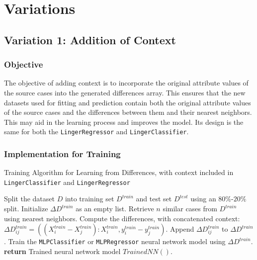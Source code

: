 \documentclass[a4paper, 12pt]{report}
\begin{document}
\section{Variations}
\subsection{Variation 1: Addition of Context}

\subsubsection{Objective}
The objective of adding context is to incorporate the original attribute values of the source cases into the generated differences array. 
This ensures that the new datasets used for fitting and prediction contain both the original attribute values of the source cases and the differences between them and their nearest neighbors. 
This may aid in the learning process and improves the model. Its design is the same for both the \texttt{LingerRegressor} and \texttt{LingerClassifier}.

\subsubsection{Implementation for Training}
\begin{algorithm}[H]
    \caption{Training Algorithm for Learning from Differences, with context included in \texttt{LingerClassifier} and \texttt{LingerRegressor}}
    \label{alg:learning_from_differences_variant_1_train}
    \begin{algorithmic}[1]
        \State Split the dataset $D$ into training set $D^{train}$ and test set $D^{test}$ using an $80\%$-$20\%$ split.
        \State Initialize $\Delta D^{train}$ as an empty list.
            \State Retrieve $n$ similar cases from $D^{train}$ using nearest neighbors.
                \State Compute the differences, with concatenated context: $\Delta D^{train}_{ij} = ((X^{train}_i - X^{train}_j):X^{train}_i, y^{train}_i - y^{train}_j)$.
                \State Append $\Delta D^{train}_{ij}$ to $\Delta D^{train}$.
            \EndFor
        \EndFor
        \State Train the \texttt{MLPClassifier} or \texttt{MLPRegressor} neural network model using $\Delta D^{train}$.
        \State \textbf{return} Trained neural network model $Trained NN()$.
    \end{algorithmic}
\end{algorithm}
\end{document}
